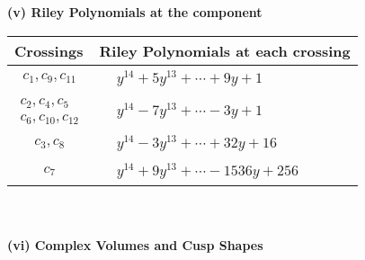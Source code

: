 \documentclass[1p]{elsarticle_modified}
\theoremstyle{definition}
\begin{document}
\newpage\renewcommand{\arraystretch}{1}
\flushleft \textbf{(v) Riley Polynomials at the component}\newline \\
\begin{tabular}{m{50pt}|m{274pt}}
Crossings & \hspace{64pt}Riley Polynomials at each crossing \\
\hline $$\begin{aligned}c_{1},c_{9},c_{11}\end{aligned}$$&$\begin{aligned}
&y^{14}+5 y^{13}+\cdots+9 y+1
\end{aligned}$\\
\hline $$\begin{aligned}c_{2},c_{4},c_{5}\\c_{6},c_{10},c_{12}\end{aligned}$$&$\begin{aligned}
&y^{14}-7 y^{13}+\cdots-3 y+1
\end{aligned}$\\
\hline $$\begin{aligned}c_{3},c_{8}\end{aligned}$$&$\begin{aligned}
&y^{14}-3 y^{13}+\cdots+32 y+16
\end{aligned}$\\
\hline $$\begin{aligned}c_{7}\end{aligned}$$&$\begin{aligned}
&y^{14}+9 y^{13}+\cdots-1536 y+256
\end{aligned}$\\
\hline
\end{tabular}\\~\\
\newpage\flushleft \textbf{(vi) Complex Volumes and Cusp Shapes}
\end{document}
